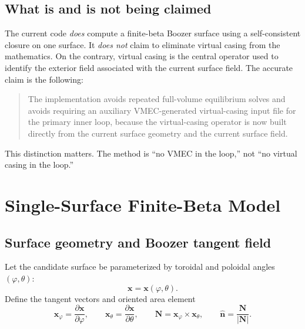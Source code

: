 \documentclass[11pt]{article}
\begin{document}
\subsection{What is and is not being claimed}
The current code \emph{does} compute a finite-beta Boozer surface using a self-consistent closure on one surface. It \emph{does not} claim to eliminate virtual casing from the mathematics. On the contrary, virtual casing is the central operator used to identify the exterior field associated with the current surface field. The accurate claim is the following:

\begin{quote}
The implementation avoids repeated full-volume equilibrium solves and avoids requiring an auxiliary VMEC-generated virtual-casing input file for the primary inner loop, because the virtual-casing operator is now built directly from the current surface geometry and the current surface field.
\end{quote}

This distinction matters. The method is ``no VMEC in the loop,'' not ``no virtual casing in the loop.''

\section{Single-Surface Finite-Beta Model}
\subsection{Surface geometry and Boozer tangent field}
Let the candidate surface be parameterized by toroidal and poloidal angles $(\varphi,\theta)$:
\begin{equation}
  \mathbf{x} = \mathbf{x}(\varphi,\theta).
\end{equation}
Define the tangent vectors and oriented area element
\begin{equation}
  \mathbf{x}_{\varphi} = \frac{\partial \mathbf{x}}{\partial \varphi},
  \qquad
  \mathbf{x}_{\theta} = \frac{\partial \mathbf{x}}{\partial \theta},
  \qquad
  \mathbf{N} = \mathbf{x}_{\varphi} \times \mathbf{x}_{\theta},
  \qquad
  \hat{\mathbf{n}} = \frac{\mathbf{N}}{|\mathbf{N}|}.
\end{equation}
\end{document}
